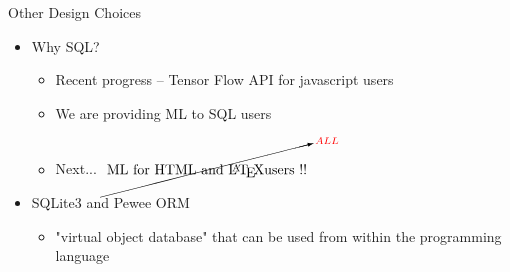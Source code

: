 \documentclass[handout, xcolor={dvipsnames}]{beamer}
\begin{document}
\begin{frame}{Other Design Choices}{}
  \begin{itemize}
   \item Why SQL?
    \begin{itemize}
        \item<1-> Recent progress -- Tensor Flow API for javascript users
        \item<2-> We are providing ML to SQL users
        \item<3-> Next... $\cancelto{\textcolor{red}{ALL}}{\text{ ML for HTML and \LaTeX users !!} }$
    \end{itemize}
    \vspace{.2in}
   \item SQLite3 and Pewee ORM
   \begin{itemize}
       \item "virtual object database" that can be used from within the programming language
   \end{itemize}
  \end{itemize}
\end{frame}
\end{document}
